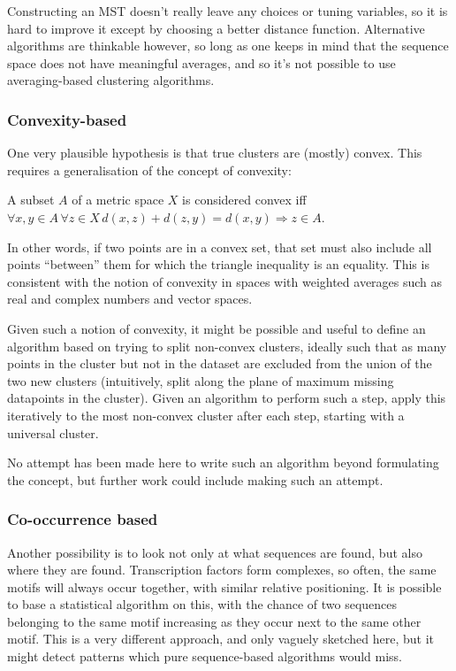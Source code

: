 \documentclass[fleqn]{book}
\begin{document}
Constructing an MST doesn't really leave any choices or tuning
variables, so it is hard to improve it except by choosing a better
distance function. Alternative algorithms are thinkable however, so long
as one keeps in mind that the sequence space does not have meaningful
averages, and so it's not possible to use averaging-based clustering
algorithms.

\subsubsection{Convexity-based}\label{convexity-based}

One very plausible hypothesis is that true clusters are (mostly) convex.
This requires a generalisation of the concept of convexity:

A subset \(A\) of a metric space \(X\) is considered convex iff
\(\forall x, y \in A \, \forall z \in X \, d(x,z) + d(z,y) = d(x,y) \Rightarrow z \in A\).

In other words, if two points are in a convex set, that set must also
include all points ``between'' them for which the triangle inequality is
an equality. This is consistent with the notion of convexity in spaces
with weighted averages such as real and complex numbers and vector
spaces.

Given such a notion of convexity, it might be possible and useful to
define an algorithm based on trying to split non-convex clusters,
ideally such that as many points in the cluster but not in the dataset
are excluded from the union of the two new clusters (intuitively, split
along the plane of maximum missing datapoints in the cluster). Given an
algorithm to perform such a step, apply this iteratively to the most
non-convex cluster after each step, starting with a universal cluster.

No attempt has been made here to write such an algorithm beyond
formulating the concept, but further work could include making such an
attempt.

\subsubsection{Co-occurrence based}\label{co-occurrence-based}

Another possibility is to look not only at what sequences are found, but
also where they are found. Transcription factors form complexes, so
often, the same motifs will always occur together, with similar relative
positioning. It is possible to base a statistical algorithm on this,
with the chance of two sequences belonging to the same motif increasing
as they occur next to the same other motif. This is a very different
approach, and only vaguely sketched here, but it might detect patterns
which pure sequence-based algorithms would miss.
\end{document}
